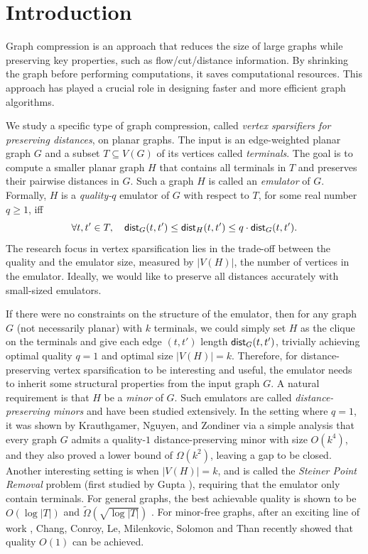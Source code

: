 \documentclass[11pt]{article}
\newcommand{\dist}{\textnormal{\textsf{dist}}}
\begin{document}
\section{Introduction}

Graph compression is an approach that reduces the size of large graphs while preserving key properties, such as flow/cut/distance information. By shrinking the graph before performing computations, it saves computational resources. This approach has played a crucial role in designing faster and more efficient graph algorithms.









We study a specific type of graph compression, called \emph{vertex sparsifiers for preserving distances}, on planar graphs. The input is an edge-weighted planar graph $G$ and a subset $T\subseteq V(G)$ of its vertices called \emph{terminals}. The goal is to compute a smaller planar graph $H$ that contains all terminals in $T$ and preserves their pairwise distances in $G$.
Such a graph $H$ is called an \emph{emulator} of $G$. Formally, $H$ is a \emph{quality-$q$} emulator of $G$ with respect to $T$, for some real number $q\ge 1$, iff
\[
\forall t,t'\in T, \quad \dist_G(t,t')\le \dist_H(t,t')\le q\cdot \dist_G(t,t').
\]
The research focus in vertex sparsification lies in the trade-off between the quality and the emulator size, measured by $|V(H)|$, the number of vertices in the emulator. Ideally, we would like to preserve all distances accurately with small-sized emulators.

If there were no constraints on the structure of the emulator, then for any graph $G$ (not necessarily planar) with $k$ terminals, we could simply set $H$ as the clique on the terminals and give each edge $(t,t')$ length $\dist_G(t,t')$, trivially achieving optimal quality $q=1$ and optimal size $|V(H)|=k$.
Therefore, for distance-preserving vertex sparsification to be interesting and useful, the emulator needs to inherit some structural properties from the input graph $G$. A natural requirement is that $H$ be a \emph{minor} of $G$. Such emulators are called \emph{distance-preserving minors} and have been studied extensively.
In the setting where $q=1$, it was shown by Krauthgamer, Nguyen, and Zondiner \cite{krauthgamer2014preserving} via a simple analysis that every graph $G$ admits a quality-$1$ distance-preserving minor with size $O(k^4)$, and they also proved a lower bound of $\Omega(k^2)$, leaving a gap to be closed. Another interesting setting is when $|V(H)|=k$, and is called the \emph{Steiner Point Removal} problem (first studied by Gupta \cite{gupta2001steiner}), requiring that the emulator only contain terminals.
For general graphs, the best achievable quality is shown to be $O(\log |T|)$ \cite{kamma2015cutting,cheung2018steiner,filtser2018steiner} and $\tilde \Omega(\sqrt{\log |T|})$ \cite{chan2006tight,chen2024lower}.
For minor-free graphs, after an exciting line of work
\cite{basu2008steiner,filtser2020scattering,hershkowitz20211,chang2023covering,chang2023shortcut}, Chang, Conroy, Le, Milenkovic, Solomon and Than recently showed that quality $O(1)$ can be achieved.
\end{document}
